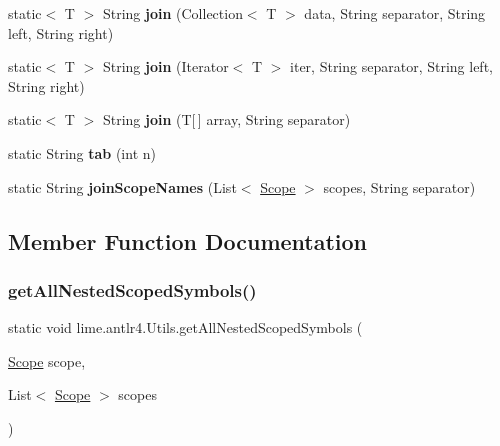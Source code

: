 \begin{DoxyCompactItemize}
\item 
\mbox{\label{classlime_1_1antlr4_1_1Utils_a22b2e139bb2492ee998c2ee2d2d6cff6}} 
static$<$ T $>$ String {\bfseries join} (Collection$<$ T $>$ data, String separator, String left, String right)
\item 
\mbox{\label{classlime_1_1antlr4_1_1Utils_afdd697d739cee8332cd1f2e43622defd}} 
static$<$ T $>$ String {\bfseries join} (Iterator$<$ T $>$ iter, String separator, String left, String right)
\item 
\mbox{\label{classlime_1_1antlr4_1_1Utils_a04b42f11b56b72780ff35e186f4e1b23}} 
static$<$ T $>$ String {\bfseries join} (T\mbox{[}$\,$\mbox{]} array, String separator)
\item 
\mbox{\label{classlime_1_1antlr4_1_1Utils_a903daab8fcc8f6f70d4406a1f1f8f11f}} 
static String {\bfseries tab} (int n)
\item 
\mbox{\label{classlime_1_1antlr4_1_1Utils_a2d872087a528a1e07fb048f588b08eb8}} 
static String {\bfseries join\+Scope\+Names} (List$<$ \hyperlink{interfacelime_1_1antlr4_1_1Scope}{Scope} $>$ scopes, String separator)
\end{DoxyCompactItemize}


\subsection{Member Function Documentation}
\mbox{\label{classlime_1_1antlr4_1_1Utils_ae4c1e656e69475dbff0b7f929bd326d1}} 
\subsubsection{\texorpdfstring{get\+All\+Nested\+Scoped\+Symbols()}{getAllNestedScopedSymbols()}}
{\footnotesize\ttfamily static void lime.\+antlr4.\+Utils.\+get\+All\+Nested\+Scoped\+Symbols (\begin{DoxyParamCaption}\item[{\hyperlink{interfacelime_1_1antlr4_1_1Scope}{Scope}}]{scope,  }\item[{List$<$ \hyperlink{interfacelime_1_1antlr4_1_1Scope}{Scope} $>$}]{scopes }\end{DoxyParamCaption})\hspace{0.3cm}{\ttfamily [static]}}

